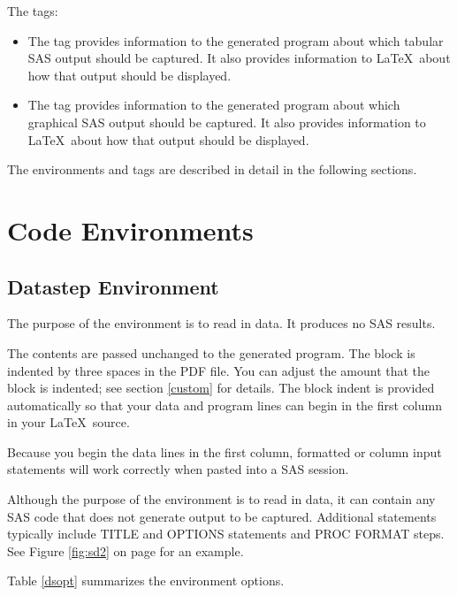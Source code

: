 \documentclass[article,oneside]{memoir}
\begin{document}
     The tags:
     \begin{itemize}
     \item The  tag provides information to the generated program about
     which tabular SAS output should be captured.
     It also provides information to \LaTeX\  about how that output should be displayed.
     \item The  tag provides information to the generated program about
     which graphical SAS output should be captured.
     It also provides information to \LaTeX\ about how that output should be displayed.
     \end{itemize}

     The environments and tags are described in detail in the following sections.

\section{Code Environments}

\subsection{Datastep Environment}

The purpose of the  environment is to read in data.
It produces no SAS results.

  The  contents are passed unchanged to the generated program.
  The  block is indented by three spaces in the PDF file.
  You can adjust the amount that the block is indented; see
  section \ref{custom} for details. The block indent is provided automatically so that
  your data and program lines can begin in the first column in your \LaTeX\ source.

  Because you begin the  data lines in the
  first column, formatted or column input statements will work correctly when
  pasted into a SAS session.


  Although the purpose of the  environment is to read in data,
  it can contain any SAS code that does not generate output
  to be captured.  Additional statements typically include
  TITLE and OPTIONS statements and PROC FORMAT steps. See Figure \ref{fig:sd2}
  on page \pageref{fig:sd2} for an example.


Table \ref{dsopt} summarizes the  environment options.
%
\end{document}
